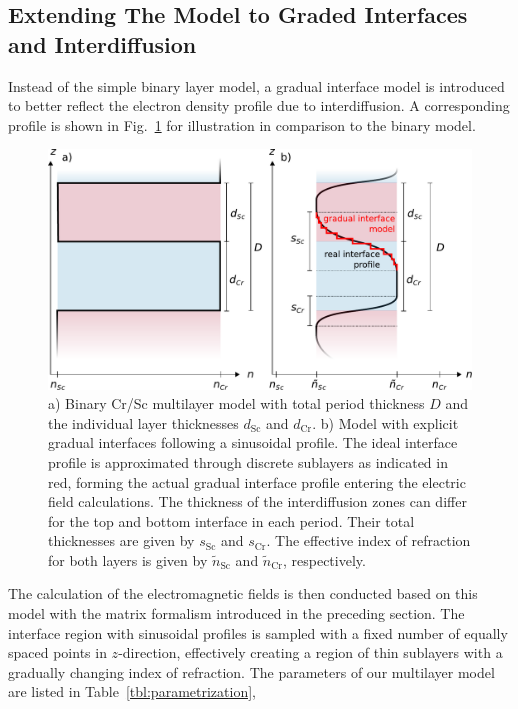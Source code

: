 \subsection{Extending The Model to Graded Interfaces and Interdiffusion}
Instead of the simple binary layer model, a gradual interface model is 
introduced to better reflect the electron density profile due to 
interdiffusion. A corresponding profile is shown in Fig.~\ref{fig:CrScModel} 
for illustration in comparison to the binary model.
\begin{figure}[htbp]
  \centering
  \includegraphics[width=\textwidth]{images/CrSc_model}
  \caption{a) Binary Cr/Sc multilayer model with total period thickness $D$ and 
the individual layer thicknesses $d_\text{Sc}$ and $d_\text{Cr}$. b) Model with 
explicit gradual interfaces following a sinusoidal profile. The ideal interface 
profile is approximated through discrete sublayers as indicated in red, forming 
the actual gradual interface profile entering the electric field calculations. 
The thickness of the interdiffusion zones can differ for the top and bottom 
interface in each period. Their total thicknesses are given by $s_\text{Sc}$ 
and $s_\text{Cr}$. The effective index of refraction for both layers is given 
by $\tilde{n}_\text{Sc}$ and $\tilde{n}_\text{Cr}$, respectively.}
  \label{fig:CrScModel}
\end{figure}
The calculation of the electromagnetic fields is then conducted based on this 
model with the matrix formalism introduced in the preceding section. The 
interface region with sinusoidal profiles is sampled with a fixed number of 
equally spaced points in $z$-direction, effectively creating a region of thin 
sublayers with a gradually changing index of refraction. The parameters of our 
multilayer model are listed in Table~\ref{tbl:parametrization},
